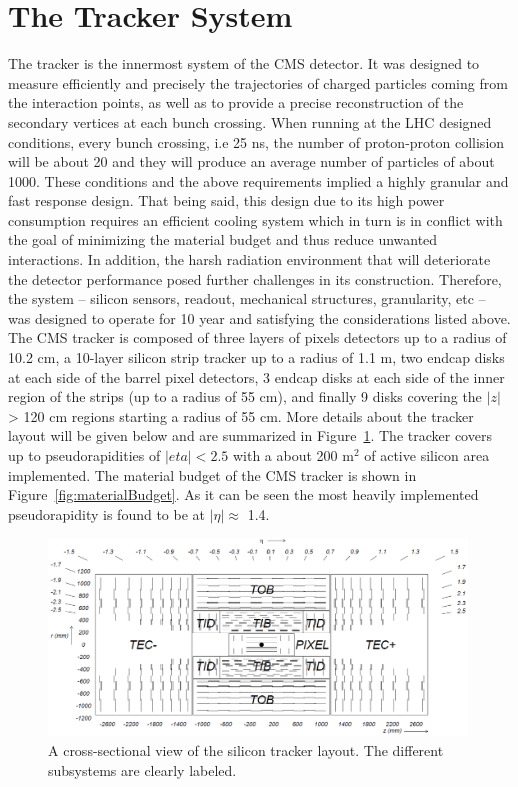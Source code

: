 \section{The Tracker System}
The tracker is the innermost system of the CMS detector.
It was designed to measure efficiently and precisely the trajectories
of charged particles coming from the interaction points, as well as to
provide a precise reconstruction of the secondary vertices at each
bunch crossing. When running at the LHC designed conditions, every
bunch crossing, i.e 25 ns, the number of proton-proton collision will
be about 20 and they will produce an average number of particles of about
1000. These conditions and the above requirements implied a highly granular and fast
response design. That being said, this design due to its high power
consumption requires an efficient cooling system which in turn is in
conflict with the goal of minimizing the material budget and thus
reduce unwanted interactions. In addition, the harsh radiation
environment that will deteriorate the detector performance posed
further challenges in its construction. Therefore, the system --
silicon sensors, readout, mechanical structures, granularity, etc --
was designed to operate for 10 year and satisfying the considerations
listed above. The CMS tracker is composed of three layers of pixels
detectors up to a radius of 10.2 cm, a 10-layer silicon strip tracker
up to a radius of 1.1 m, two endcap disks at each side of the barrel pixel detectors, 3
endcap disks at each side of the inner region of the strips (up to a
radius of 55 cm), and finally 9 disks covering the $|z|$ > 120 cm
regions starting a radius of 55 cm. More details about the tracker
layout will be given below and are summarized in
Figure~\ref{fig:trackerlayout}. The tracker covers up to
pseudorapidities of $|eta| < 2.5$ with a about 200 m$^2$ of active
silicon area implemented. The material budget of the CMS tracker is
shown in Figure~\ref{fig:materialBudget}. As it can be seen the most
heavily implemented pseudorapidity is found to be at $|\eta|\approx$ 1.4.
\begin{figure}
 \centering
\includegraphics[width=0.99\textwidth]{CMS_DetectorFigures/TrackerLayout.png}
 \caption{A cross-sectional view of the silicon tracker layout. The
   different subsystems are clearly labeled.\label{fig:trackerlayout}}
\end{figure}
